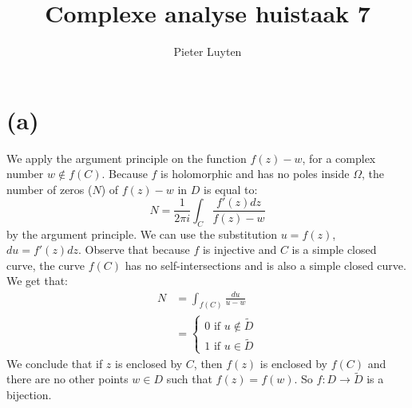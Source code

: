 \documentclass[a4paper, 11pt]{article}
\title{Complexe analyse huistaak 7}
\author{Pieter Luyten}
\begin{document}
\maketitle
\noindent {}

\section*{(a)}
We apply the argument principle on the function $f(z)-w$, for a complex number $w \not \in f(C)$. Because $f$ is holomorphic and has no poles inside $\Omega$, the number of zeros ($N$) of $f(z)-w$ in $D$ is equal to:
\begin{equation*}
	N = \frac{1}{2\pi i} \int_{C}^{} \frac{f'(z)dz}{f(z)-w}
\end{equation*}
by the argument principle. We can use the substitution $u=f(z)$, $du=f'(z)dz$. 
Observe that because $f$ is injective and $C$ is a simple closed curve, the curve $f(C)$ has no self-intersections and is also a simple closed curve.
We get that:
\begin{align}
	N &= \int_{f(C)}^{} \frac{du}{u-w}\\
	  &= \begin{cases} 0 \text{ if } u \not\in \widetilde{D}\\
	  1 \text{ if } u \in \widetilde D\end{cases}
	\label{eq:mult}
\end{align}
We conclude that if $z$ is enclosed by $C$, then $f(z)$ is enclosed by $f(C)$ and there are no other points $w \in D$ such that $f(z)=f(w)$. So $f:D \rightarrow \widetilde{D}$ is a bijection.
\end{document}
